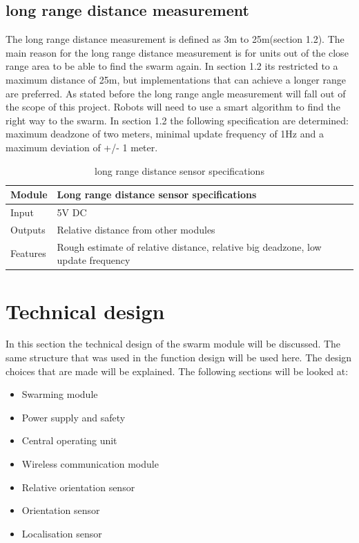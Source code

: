 \documentclass[10pt,a4paper]{article}
\begin{document}
\subsection{long range distance measurement}
The long range distance measurement is defined as 3m to 25m(section 1.2). The main reason for the long range distance measurement is for units out of the close range area to be able to find the swarm again. In section 1.2 its restricted to a maximum distance of 25m, but implementations that can achieve a longer range are preferred. As stated before the long range angle measurement will fall out of the scope of this project. Robots will need to use a smart algorithm to find the right way to the swarm. In section 1.2 the following specification are determined: maximum deadzone of two meters, minimal update frequency of 1Hz and a maximum deviation of +/- 1 meter.

\begin{table}[H]
\centering
\caption{long range distance sensor specifications}
\label{longrangesensor}
\begin{tabular}{|p{}|p{}|}
\hline
Module   & Long range distance sensor specifications                          \\ \hline
Input    & 5V DC                                           \\ \hline
Outputs  & Relative distance from other modules                                        \\ \hline
Features & Rough estimate of relative distance, relative big deadzone, low update frequency  \\ \hline
\end{tabular}
\end{table}


\newpage

\section{Technical design}
 
In this section the technical design of the swarm module will be discussed. The same structure that was used in the function design will be used here. The design choices that are made will be explained. The following sections will be looked at: 


\begin{itemize}
\setlength\itemsep{0em}
\item Swarming module
\item Power supply and safety
\item Central operating unit
\item Wireless communication module
\item Relative orientation sensor
\item Orientation sensor
\item Localisation sensor
\end{itemize}
\end{document}
